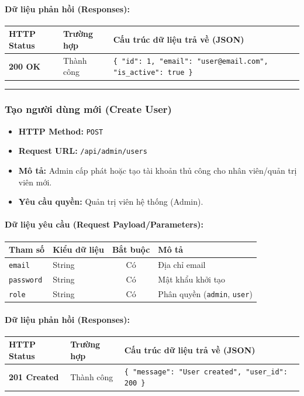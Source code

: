 \documentclass[12pt,a4paper]{article}
\begin{document}
\paragraph{Dữ liệu phản hồi (Responses):}
\begin{longtable}{|p{2.8cm}|p{3.2cm}|p{8.0cm}|}
\hline
\textbf{HTTP Status} & \textbf{Trường hợp} & \textbf{Cấu trúc dữ liệu trả về (JSON)} \\ \hline
\endhead
\textbf{200 OK} & Thành công & \texttt{\{ "id": 1, "email": "user@email.com", "is\_active": true \}} \\ \hline
\end{longtable}

\vskip 0.4cm
\noindent\rule{\textwidth}{0.3pt}
\vskip 0.4cm

\subsubsection{Tạo người dùng mới (Create User)}
\begin{itemize}[leftmargin=*]
    \item \textbf{HTTP Method:} \texttt{POST}
    \item \textbf{Request URL:} \texttt{/api/admin/users}
    \item \textbf{Mô tả:} Admin cấp phát hoặc tạo tài khoản thủ công cho nhân viên/quản trị viên mới.
    \item \textbf{Yêu cầu quyền:} Quản trị viên hệ thống (Admin).
\end{itemize}

\paragraph{Dữ liệu yêu cầu (Request Payload/Parameters):}
\begin{longtable}{|p{2.8cm}|p{2.2cm}|c|p{7.0cm}|}
\hline
\textbf{Tham số} & \textbf{Kiểu dữ liệu} & \textbf{Bắt buộc} & \textbf{Mô tả} \\ \hline
\endhead
\texttt{email} & String & Có & Địa chỉ email \\ \hline
\texttt{password} & String & Có & Mật khẩu khởi tạo \\ \hline
\texttt{role} & String & Có & Phân quyền (\texttt{admin}, \texttt{user}) \\ \hline
\end{longtable}

\paragraph{Dữ liệu phản hồi (Responses):}
\begin{longtable}{|p{2.8cm}|p{3.2cm}|p{8.0cm}|}
\hline
\textbf{HTTP Status} & \textbf{Trường hợp} & \textbf{Cấu trúc dữ liệu trả về (JSON)} \\ \hline
\endhead
\textbf{201 Created} & Thành công & \texttt{\{ "message": "User created", "user\_id": 200 \}} \\ \hline
\end{longtable}
\end{document}
